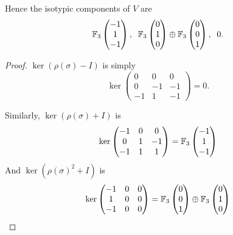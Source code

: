 \documentclass{unswmaths}
\begin{document}
\begin{corollary}
    Hence the isotypic components of $V$ are
    \begin{equation*}
        {\mathbb{F}_3}\begin{pmatrix}
            -1\\1\\-1
        \end{pmatrix},\;\;{\mathbb{F}_3}\begin{pmatrix}0\\1\\0  \end{pmatrix}\oplus{\mathbb{F}_3}\begin{pmatrix} 0\\0\\1\end{pmatrix},\;\;0.
    \end{equation*}
\end{corollary}
\begin{proof}
    $\ker (\rho(\sigma)-I)$ is simply
    \begin{equation*}
        \ker\begin{pmatrix}
            0 & 0 & 0\\
            0 & -1 & -1\\
            -1 & 1 & -1
        \end{pmatrix} = 0.
    \end{equation*}
    
    Similarly, $\ker(\rho(\sigma)+I)$ is
    \begin{equation*}
        \ker\begin{pmatrix}
            -1 & 0 & 0\\
            0 & 1 & -1\\
            -1 & 1 & 1
        \end{pmatrix} = {\mathbb{F}_3}\begin{pmatrix}
                -1 \\1 \\-1
        \end{pmatrix}
    \end{equation*}
    And $\ker(\rho(\sigma)^2+I)$ is
    \begin{equation*}
        \ker\begin{pmatrix}
            -1 & 0 & 0\\
            1 & 0 & 0\\
            -1 & 0 & 0
        \end{pmatrix}
        = {\mathbb{F}_3}\begin{pmatrix}
            0\\0\\1
        \end{pmatrix}\oplus{\mathbb{F}_3}
        \begin{pmatrix}
            0\\1\\0
        \end{pmatrix}       
    \end{equation*}
\end{proof}
\end{document}

